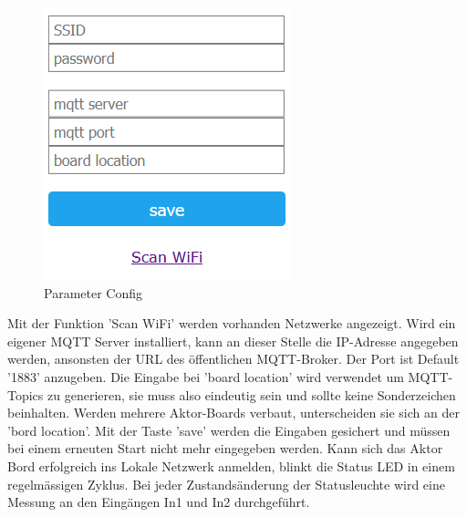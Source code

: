 \begin{figure}[H]
\begin{center}
\begin{minipage}[b]{.3\linewidth}
		\includegraphics[width=\textwidth]{graphics/Configportal2.PNG}
		\caption{Parameter Config}
	\end{minipage}
\end{center}
\end{figure}
Mit der Funktion 'Scan WiFi' werden vorhanden Netzwerke angezeigt. Wird ein eigener MQTT Server installiert, kann an dieser Stelle die IP-Adresse angegeben werden, ansonsten der URL des öffentlichen MQTT-Broker. Der Port ist Default '1883' anzugeben. Die Eingabe bei 'board location' wird verwendet um MQTT-Topics zu generieren, sie muss also eindeutig sein und sollte keine Sonderzeichen beinhalten. Werden mehrere Aktor-Boards verbaut, unterscheiden sie sich an der 'bord location'. Mit der Taste 'save' werden die Eingaben gesichert und müssen bei einem erneuten Start nicht mehr eingegeben werden. Kann sich das Aktor Bord erfolgreich ins Lokale Netzwerk anmelden, blinkt die Status LED in einem regelmässigen Zyklus. Bei jeder Zustandsänderung der Statusleuchte wird eine Messung an den Eingängen In1 und In2 durchgeführt. 

